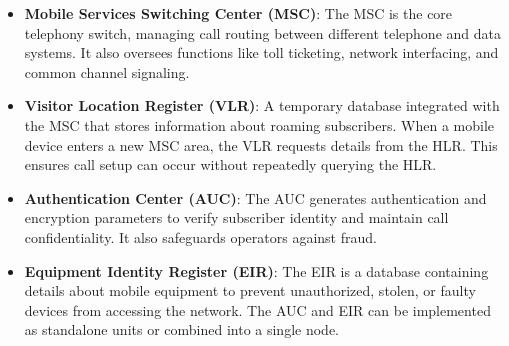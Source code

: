 \documentclass[conference]{IEEEtran}
\begin{document}
\begin{itemize}
\begin{itemize}
        \item \textbf{Mobile Services Switching Center (MSC)}: The MSC is the core telephony switch, managing call routing between different telephone and data systems. It also oversees functions like toll ticketing, network interfacing, and common channel signaling.

        \item \textbf{Visitor Location Register (VLR)}: A temporary database integrated with the MSC that stores information about roaming subscribers. When a mobile device enters a new MSC area, the VLR requests details from the HLR. This ensures call setup can occur without repeatedly querying the HLR.

        \item \textbf{Authentication Center (AUC)}: The AUC generates authentication and encryption parameters to verify subscriber identity and maintain call confidentiality. It also safeguards operators against fraud.

        \item \textbf{Equipment Identity Register (EIR)}: The EIR is a database containing details about mobile equipment to prevent unauthorized, stolen, or faulty devices from accessing the network. The AUC and EIR can be implemented as standalone units or combined into a single node.

    \end{itemize}
    
\end{itemize}
\end{document}

